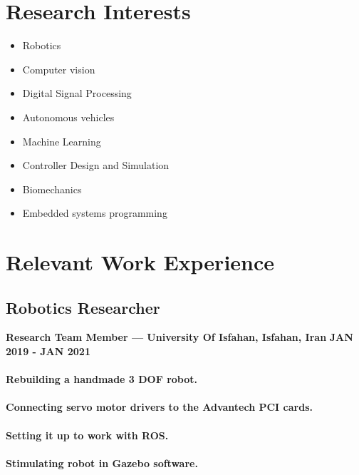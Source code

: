 \documentclass[a4paper]{article}
\begin{document}
    \section{Research Interests}


        \begin{multicols}{2}[]
            \begin{itemize}
                \itemsep0em 
                \item Robotics
                \item Computer vision
                \item Digital Signal Processing
                \item Autonomous vehicles
                \item Machine Learning
                \item Controller Design and Simulation
                \item Biomechanics
                \item Embedded systems programming
            \end{itemize}
        \end{multicols}

    \section{Relevant Work Experience}
        \subsection{Robotics Researcher}
        {\bfseries\small Research Team Member — University Of Isfahan, Isfahan, Iran}
        \hfill
        {\bfseries\small JAN 2019 - JAN 2021}

        \paragraph{Rebuilding a handmade 3 DOF robot.}
        \paragraph{Connecting servo motor drivers to the Advantech PCI cards.}
        \paragraph{Setting it up to work with ROS.}
        \paragraph{Stimulating robot in Gazebo software.}
\end{document}
